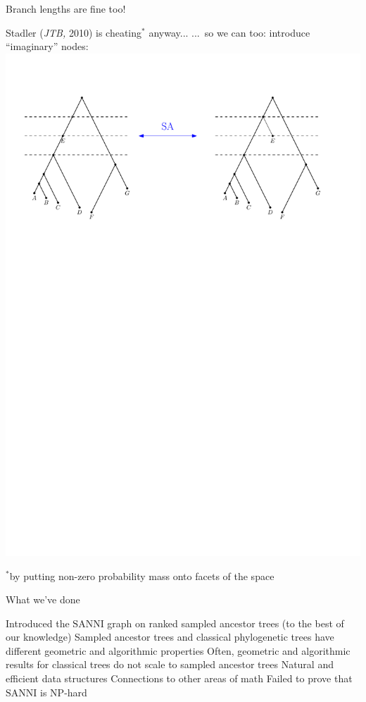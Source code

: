 \documentclass{beamer}
\begin{document}
\begin{frame}{Branch lengths are fine too!}
\begin{block}{Stadler (\emph{JTB,} 2010) is cheating${}^*$ anyway...}
...\ so we can too: introduce ``imaginary'' nodes:\\
\vskip10pt
\centering
\includegraphics[width=\framewidth]{SAT_dimension_solved}
\end{block}

\pause

\begin{block}{}
${}^*$by putting non-zero probability mass onto facets of the space
\end{block}
\end{frame}

\begin{frame}{What we've done}

\begin{block}{}
\begin{outline}
\1 Introduced the $\mathrm{SANNI}$ graph on ranked sampled ancestor trees (to the best of our knowledge)
\1 Sampled ancestor trees and classical phylogenetic trees have different geometric and algorithmic properties
\1 Often, geometric and algorithmic results for classical trees do not scale to sampled ancestor trees
\1 Natural and efficient data structures
\1 Connections to other areas of math
\pause
\1 Failed to prove that $\mathrm{SANNI}$ is $\mathrm{NP}$-hard
\end{outline}
\end{block}
\end{frame}
\end{document}
